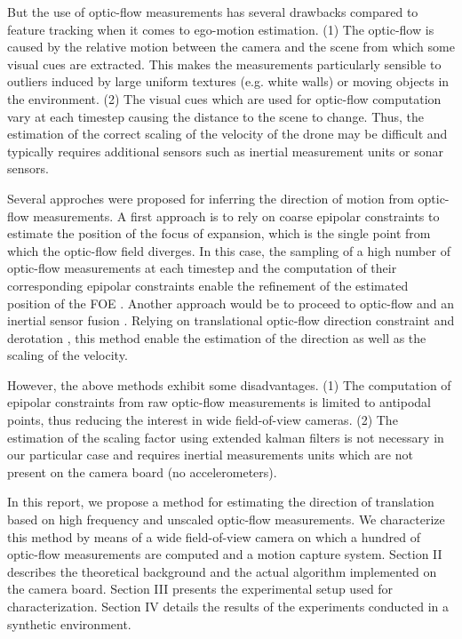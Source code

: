 But the use of optic-flow measurements has several drawbacks compared to feature tracking when it comes to ego-motion estimation. (1) The optic-flow is caused by the relative motion between the camera and the scene from which some visual cues are extracted. This makes the measurements particularly sensible to outliers induced by large uniform textures (e.g. white walls) or moving objects in the environment. (2) The visual cues which are used for optic-flow computation vary at each timestep causing the distance to the scene to change. Thus, the estimation of the correct scaling of the velocity of the drone may be difficult and typically requires additional sensors such as inertial measurement units \cite{ekf} or sonar sensors.

Several approches were proposed for inferring the direction of motion from optic-flow measurements. A first approach is to rely on coarse epipolar constraints to estimate the position of the focus of expansion, which is the single point from which the optic-flow field diverges. In this case, the sampling of a high number of optic-flow measurements at each timestep and the computation of their corresponding epipolar constraints enable the refinement of the estimated position of the FOE \cite{lim}. Another approach would be to proceed to optic-flow and an inertial sensor fusion \cite{ekf}. Relying on translational optic-flow direction constraint and derotation \cite{derotation}, this method enable the estimation of the direction as well as the scaling of the velocity.

However, the above methods exhibit some disadvantages. (1) The computation of epipolar constraints from raw optic-flow measurements is limited to antipodal points, thus reducing the interest in wide field-of-view cameras. (2) The estimation of the scaling factor using extended kalman filters is not necessary in our particular case and requires inertial measurements units which are not present on the camera board (no accelerometers).

In this report, we propose a method for estimating the direction of translation based on high frequency and unscaled optic-flow measurements. We characterize this method by means of a wide field-of-view camera on which a hundred of optic-flow measurements are computed and a motion capture system. Section II describes the theoretical background and the actual algorithm implemented on the camera board. Section III presents the experimental setup used for characterization. Section IV details the results of the experiments conducted in a synthetic environment.